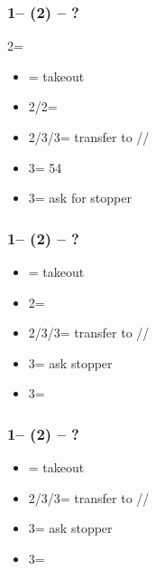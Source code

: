 \subsubsection*{1\clubs -- (2\diams) -- ?}
2\diams = \diams
\begin{itemize}
    \item \dbl = takeout
    \item 2\hearts/2\spades = \nat\ \nf
    \item 2\nt/3\diams/3\hearts = transfer to \clubs/\hearts/\spades\ \invp
    \item 3\clubs = 54\major\ \gf
    \item 3\spades = ask for \diams stopper
\end{itemize}

\subsubsection*{1\clubs -- (2\hearts) -- ?}
\begin{itemize}
    \item \dbl = takeout
    \item 2\spades = \nat\ \nf
    \item 2\nt/3\clubs/3\hearts = transfer to \clubs/\diams/\spades\ \invp
    \item 3\diams = ask stopper
    \item 3\spades = \minor
\end{itemize}

\subsubsection*{1\clubs -- (2\spades) -- ?}
\begin{itemize}
    \item \dbl = takeout
    \item 2\nt/3\clubs/3\diams = transfer to \clubs/\diams/\hearts\ \invp
    \item 3\hearts = ask stopper
    \item 3\spades = \minor
\end{itemize}


